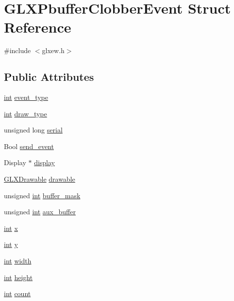 \hypertarget{struct_g_l_x_pbuffer_clobber_event}{}\section{G\+L\+X\+Pbuffer\+Clobber\+Event Struct Reference}
\label{struct_g_l_x_pbuffer_clobber_event}


{\ttfamily \#include $<$glxew.\+h$>$}

\subsection*{Public Attributes}
\begin{DoxyCompactItemize}
\item 
\hyperlink{wglew_8h_a500a82aecba06f4550f6849b8099ca21}{int} \hyperlink{struct_g_l_x_pbuffer_clobber_event_a30d7162d8d77246b01f5e610cda4da68}{event\+\_\+type}
\item 
\hyperlink{wglew_8h_a500a82aecba06f4550f6849b8099ca21}{int} \hyperlink{struct_g_l_x_pbuffer_clobber_event_a243f92b79d3cfbde73eab02815be2320}{draw\+\_\+type}
\item 
unsigned long \hyperlink{struct_g_l_x_pbuffer_clobber_event_a6390b2875ae06a4cb827d2b4c321eda3}{serial}
\item 
Bool \hyperlink{struct_g_l_x_pbuffer_clobber_event_aa51969e67e4ad6095bda26ca64fe8ba6}{send\+\_\+event}
\item 
Display $\ast$ \hyperlink{struct_g_l_x_pbuffer_clobber_event_aeb49bb93cc59448e75d66170a39596d1}{display}
\item 
\hyperlink{glxew_8h_a826f51745d9d6c81bdbac47ae2b80cf7}{G\+L\+X\+Drawable} \hyperlink{struct_g_l_x_pbuffer_clobber_event_a388908b766e35205c1a461ea8b60439f}{drawable}
\item 
unsigned \hyperlink{wglew_8h_a500a82aecba06f4550f6849b8099ca21}{int} \hyperlink{struct_g_l_x_pbuffer_clobber_event_aff4c23d00f6dad98427f8d32a5f10580}{buffer\+\_\+mask}
\item 
unsigned \hyperlink{wglew_8h_a500a82aecba06f4550f6849b8099ca21}{int} \hyperlink{struct_g_l_x_pbuffer_clobber_event_a13193b6e7e3e52b15f754fe91403b7ec}{aux\+\_\+buffer}
\item 
\hyperlink{wglew_8h_a500a82aecba06f4550f6849b8099ca21}{int} \hyperlink{struct_g_l_x_pbuffer_clobber_event_a8f0a7162a033c89ee94ce535580dbc32}{x}
\item 
\hyperlink{wglew_8h_a500a82aecba06f4550f6849b8099ca21}{int} \hyperlink{struct_g_l_x_pbuffer_clobber_event_a69eb7ac60d36ac3ec4550ac206cfc61f}{y}
\item 
\hyperlink{wglew_8h_a500a82aecba06f4550f6849b8099ca21}{int} \hyperlink{struct_g_l_x_pbuffer_clobber_event_aaca375fecb872c73c60cd5d0bfc7c7a5}{width}
\item 
\hyperlink{wglew_8h_a500a82aecba06f4550f6849b8099ca21}{int} \hyperlink{struct_g_l_x_pbuffer_clobber_event_aed4e539c896bdad15217bf92c28f8520}{height}
\item 
\hyperlink{wglew_8h_a500a82aecba06f4550f6849b8099ca21}{int} \hyperlink{struct_g_l_x_pbuffer_clobber_event_a61e9f6b31738464dca67f909fcacd298}{count}
\end{DoxyCompactItemize}


